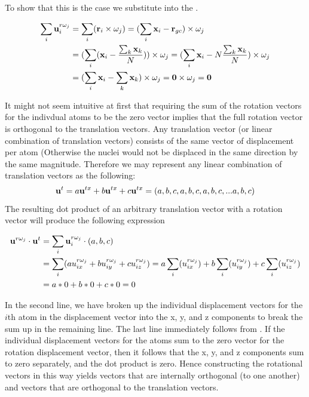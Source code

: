 To show that this is the case we substitute  into the .
\begin{widetext}
\begin{equation}
\begin{split}
\label{eq:sumtozerofull}
\sum_i {\bf{u}}^{r\omega_j}_i&=\sum_i ({\bf{r}}_{i}\times {\bf{\omega}}_j)=(\sum_i{\bf{x}}_i-{\bf{r}}_{gc})\times {\bf{\omega}}_j \\
&=(\sum_i({\bf{x}}_i-\frac{\sum_k {\bf{x}}_k}{N}))\times {\bf{\omega}}_j = (\sum_i{\bf{x}}_i-N\frac{\sum_k {\bf{x}}_k}{N})\times{\bf{\omega}}_j \\
&=(\sum_i{\bf{x}}_i-\sum_k {\bf{x}}_k)\times{\bf{\omega}}_j={\bf{0}}\times{\bf{\omega}}_j={\bf{0}}
\end{split}
\end{equation}
\end{widetext}
It might not seem intuitive at first that requiring the sum of the rotation vectors for the indivdual atoms to be the zero vector implies that the full rotation vector is orthogonal to the translation vectors.
Any translation vector (or linear combination of translation vectors) consists of the same vector of displacement per atom (Otherwise the nuclei would not be displaced in the same direction by the same magnitude. 
Therefore we may represent any linear combination of translation vectors as the following:
\begin{equation}
 {\bf{u}}^{t} =a{\bf{u}}^{tx}+b{\bf{u}}^{tx}+c{\bf{u}}^{tx}=(a,b,c, a,b,c, a,b,c, . . .a,b,c)
\end{equation}
The resulting dot product of an arbitrary translation vector with a rotation vector will produce the following expression
\begin{widetext}
\begin{equation}
\begin{split}
 {\bf{u}}^{r\omega_j}\cdot{\bf{u}}^{t}&=\sum_i {\bf{u}}^{r\omega_j}_i \cdot (a,b,c) \\
 &=\sum_i(a u^{r\omega_j}_{ix}+b u^{r\omega_j}_{iy}+c u^{r\omega_j}_{iz})= a\sum_i (u^{r\omega_j}_{ix})+b \sum_i (u^{r\omega_j}_{iy})+c \sum_i(u^{r\omega_j}_{iz}) \\
 &=a*0+b*0+c*0=0
\end{split}
\end{equation}
\end{widetext}
In the second line, we have broken up the individual displacement vectors for the $i$th atom in the displacement vector into the x, y, and z components to break the sum up in the remaining line. 
The last line immediately follows from .  
If the individual displacement vectors for the atoms sum to the zero vector for the rotation displacement vector, then it follows that the 
x, y, and z components sum to zero separately, and the dot product is zero. 
Hence constructing the rotational vectors in this way yields vectors that are internally orthogonal (to one another) and vectors
that are orthogonal to the translation vectors.  

